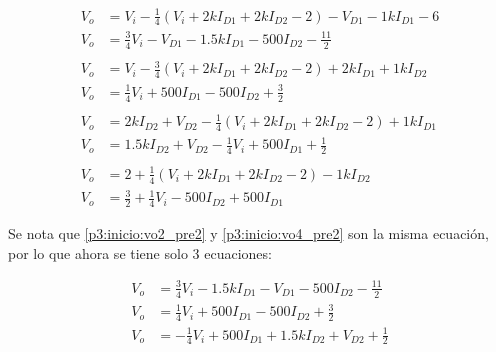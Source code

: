 \begin{align}
  V_o &=
    V_i
    - \frac{1}{4} \left( V_i + 2k I_{D1} + 2k I_{D2} - 2 \right)
    - V_{D1}
    - 1k I_{D1}
    - 6 \nonumber
  \\
  V_o &=
    \frac{3}{4} V_i
    - V_{D1}
    - 1.5k I_{D1}
    - 500 I_{D2}
    - \frac{11}{2} \label{p3:inicio:vo1_pre2}
  \\
  \nonumber \\
  V_o &=
    V_i
    - \frac{3}{4} \left( V_i + 2k I_{D1} + 2k I_{D2} - 2 \right)
    + 2k I_{D1}
    + 1k I_{D2} \nonumber
  \\
  V_o &=
    \frac{1}{4} V_i
    + 500 I_{D1}
    - 500 I_{D2}
    + \frac{3}{2} \label{p3:inicio:vo2_pre2}
  \\
  \nonumber \\
  V_o &=
    2k I_{D2}
    + V_{D2}
    - \frac{1}{4} \left( V_i + 2k I_{D1} + 2k I_{D2} - 2 \right)
    + 1k I_{D1} \nonumber
  \\
  V_o &=
    1.5k I_{D2}
    + V_{D2}
    - \frac{1}{4} V_i
    + 500 I_{D1}
    + \frac{1}{2} \label{p3:inicio:vo3_pre2}
  \\
  \nonumber \\
  V_o &=
    2
    + \frac{1}{4} \left( V_i + 2k I_{D1} + 2k I_{D2} - 2 \right)
    - 1k I_{D2} \nonumber
  \\
  V_o &=
    \frac{3}{2}
    + \frac{1}{4} V_i
    - 500 I_{D2}
    + 500 I_{D1} \label{p3:inicio:vo4_pre2}
\end{align}

Se nota que \ref{p3:inicio:vo2_pre2} y \ref{p3:inicio:vo4_pre2} son la misma
ecuación, por lo que ahora se tiene solo 3 ecuaciones:

\begin{align}
  V_o &=
    \frac{3}{4} V_i
    - 1.5k I_{D1}
    - V_{D1}
    - 500 I_{D2}
    - \frac{11}{2} \label{p3:inicio:vo1}
  \\
  V_o &=
    \frac{1}{4} V_i
    + 500 I_{D1}
    - 500 I_{D2}
    + \frac{3}{2} \label{p3:inicio:vo2}
  \\
  V_o &=
    - \frac{1}{4} V_i
    + 500 I_{D1}
    + 1.5k I_{D2}
    + V_{D2}
    + \frac{1}{2} \label{p3:inicio:vo3}
\end{align}

